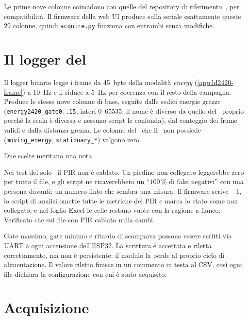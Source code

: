 Le prime nove colonne coincidono con quelle del repository di
riferimento~\cite{repoCallisto}, per compatibilità. Il firmware della web UI produce
sulla seriale esattamente queste 29 colonne, quindi \texttt{acquire.py} funziona con
entrambi senza modifiche.

\section{Il logger del \ldc}

Il logger binario legge i frame da 45~byte della modalità \emph{energy}
(\cref{app:ld2420-frame}) a 10~Hz e li riduce a 5~Hz per coerenza con il resto della
campagna. Produce le stesse nove colonne di base, seguite dalle sedici energie grezze
(\texttt{energy2420\_gate0..15}, interi 0--65535: il nome è diverso da quello del
\ldb\ proprio perché la scala è diversa e nessuno script le confonda), dal conteggio
dei frame validi e dalla distanza grezza. Le colonne del \ldb\ che il \ldc\ non
possiede (\texttt{moving\_energy}, \texttt{stationary\_*}) valgono zero.

Due scelte meritano una nota.

\begin{description}[leftmargin=1.4em,style=nextline,itemsep=3pt]
  \item[Il PIR non collegato vale $-1$, non $0$] Nei test del solo \ldc\ il PIR non è
    cablato. Un piedino non collegato leggerebbe zero per tutto il file, e gli script
    ne ricaverebbero un ``$100\,\%$ di falsi negativi'' con una persona davanti: un
    numero finto che sembra una misura. Il firmware scrive $-1$, lo script di
    analisi omette tutte le metriche del PIR e marca lo stato come non collegato, e
    nel foglio Excel le celle restano vuote con la ragione a fianco. Verificato che
    sui file con PIR cablato nulla cambi.
  \item[Parametri scritti a ogni avvio, in RAM] Gate massimo, gate minimo e ritardo
    di scomparsa possono essere scritti via UART a ogni accensione dell'ESP32. La
    scrittura è accettata e riletta correttamente, ma non è persistente: il modulo la
    perde al proprio ciclo di alimentazione. Il valore riletto finisce in un
    commento in testa al CSV, così ogni file dichiara la configurazione con cui è
    stato acquisito.
\end{description}

\section{Acquisizione}

